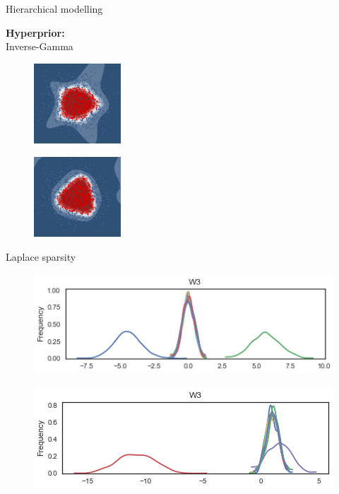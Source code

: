 \documentclass{beamer}
\begin{document}
\begin{frame}{Hierarchical modelling}
	\begin{minipage}[t]{0.32\columnwidth}
		\vspace{0.2cm}
		\textbf{Hyperprior:} \\Inverse-Gamma
	\end{minipage}
	\begin{minipage}[t]{0.32\columnwidth}
		\begin{figure}
			\includegraphics[height=3cm]{pres_pics/h_gauss.png}
		\end{figure}
	\end{minipage}
	\begin{minipage}[t]{0.32\columnwidth}
		\begin{figure}
			\includegraphics[height=3cm]{pres_pics/h_laplace.png}
		\end{figure}
	\end{minipage}
\end{frame} 
\begin{frame}{Laplace sparsity}
	\begin{figure}
		\includegraphics[width=1\columnwidth]{pres_pics/trace_laplace_w3.png}
	\end{figure}
	\begin{figure}
		\includegraphics[width=1\columnwidth]{pres_pics/trace_cauchy_w3.png}
	\end{figure}
\end{frame}
\end{document}
